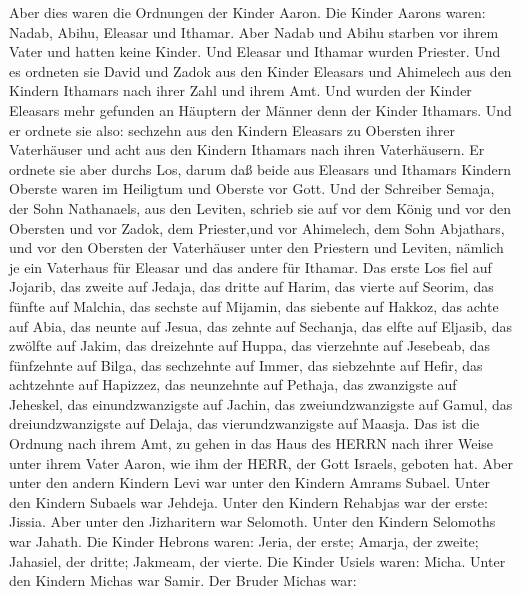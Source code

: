  Aber dies waren die Ordnungen der Kinder Aaron. Die Kinder
Aarons waren: Nadab, Abihu, Eleasar und Ithamar.  Aber Nadab
und Abihu starben vor ihrem Vater und hatten keine Kinder. Und Eleasar
und Ithamar wurden Priester.  Und es ordneten sie David und
Zadok aus den Kinder Eleasars und Ahimelech aus den Kindern Ithamars
nach ihrer Zahl und ihrem Amt.  Und wurden der Kinder
Eleasars mehr gefunden an Häuptern der Männer denn der Kinder Ithamars.
Und er ordnete sie also: sechzehn aus den Kindern Eleasars zu Obersten
ihrer Vaterhäuser und acht aus den Kindern Ithamars nach ihren
Vaterhäusern.  Er ordnete sie aber durchs Los, darum daß
beide aus Eleasars und Ithamars Kindern Oberste waren im Heiligtum und
Oberste vor Gott.  Und der Schreiber Semaja, der Sohn
Nathanaels, aus den Leviten, schrieb sie auf vor dem König und vor den
Obersten und vor Zadok, dem Priester,und vor Ahimelech, dem Sohn
Abjathars, und vor den Obersten der Vaterhäuser unter den Priestern und
Leviten, nämlich je ein Vaterhaus für Eleasar und das andere für
Ithamar.  Das erste Los fiel auf Jojarib, das zweite auf
Jedaja,  das dritte auf Harim, das vierte auf Seorim,
 das fünfte auf Malchia, das sechste auf Mijamin,
 das siebente auf Hakkoz, das achte auf Abia, 
das neunte auf Jesua, das zehnte auf Sechanja,  das elfte
auf Eljasib, das zwölfte auf Jakim,  das dreizehnte auf
Huppa, das vierzehnte auf Jesebeab,  das fünfzehnte auf
Bilga, das sechzehnte auf Immer,  das siebzehnte auf Hefir,
das achtzehnte auf Hapizzez,  das neunzehnte auf Pethaja,
das zwanzigste auf Jeheskel,  das einundzwanzigste auf
Jachin, das zweiundzwanzigste auf Gamul,  das
dreiundzwanzigste auf Delaja, das vierundzwanzigste auf Maasja.
 Das ist die Ordnung nach ihrem Amt, zu gehen in das Haus
des HERRN nach ihrer Weise unter ihrem Vater Aaron, wie ihm der HERR,
der Gott Israels, geboten hat.  Aber unter den andern
Kindern Levi war unter den Kindern Amrams Subael. Unter den Kindern
Subaels war Jehdeja.  Unter den Kindern Rehabjas war der
erste: Jissia.  Aber unter den Jizharitern war Selomoth.
Unter den Kindern Selomoths war Jahath.  Die Kinder Hebrons
waren: Jeria, der erste; Amarja, der zweite; Jahasiel, der dritte;
Jakmeam, der vierte.  Die Kinder Usiels waren: Micha. Unter
den Kindern Michas war Samir.  Der Bruder Michas war:
